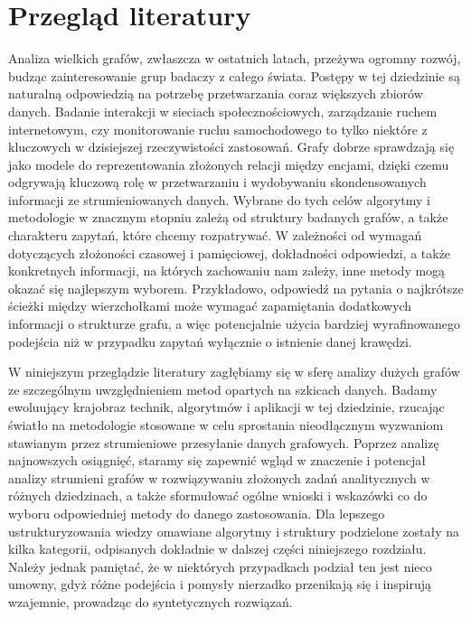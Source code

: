 \chapter{Przegląd literatury}

    Analiza wielkich grafów, zwłaszcza w ostatnich latach, przeżywa ogromny rozwój, budząc zainteresowanie grup badaczy z całego świata. Postępy w tej dziedzinie są naturalną odpowiedzią na potrzebę przetwarzania coraz większych zbiorów danych. Badanie interakcji w sieciach społecznościowych, zarządzanie ruchem internetowym, czy monitorowanie ruchu samochodowego to tylko niektóre z kluczowych w dzisiejszej rzeczywistości zastosowań. Grafy dobrze sprawdzają się jako modele do reprezentowania złożonych relacji między encjami, dzięki czemu odgrywają kluczową rolę w przetwarzaniu i wydobywaniu skondensowanych informacji ze strumieniowanych danych. Wybrane do tych celów algorytmy i metodologie w znacznym stopniu zależą od struktury badanych grafów, a także charakteru zapytań, które chcemy rozpatrywać. W zależności od wymagań dotyczących złożoności czasowej i pamięciowej, dokładności odpowiedzi, a także konkretnych informacji, na których zachowaniu nam zależy, inne metody mogą okazać się najlepszym wyborem. Przykładowo, odpowiedź na pytania o najkrótsze ścieżki między wierzchołkami może wymagać zapamiętania dodatkowych informacji o strukturze grafu, a więc potencjalnie użycia bardziej wyrafinowanego podejścia niż w przypadku zapytań wyłącznie o istnienie danej krawędzi. 

    W niniejszym przeglądzie literatury zagłębiamy się w sferę analizy dużych grafów ze szczególnym uwzględnieniem metod opartych na szkicach danych. Badamy ewoluujący krajobraz technik, algorytmów i aplikacji w tej dziedzinie, rzucając światło na metodologie stosowane w celu sprostania nieodłącznym wyzwaniom stawianym przez strumieniowe przesyłanie danych grafowych. Poprzez analizę najnowszych osiągnięć, staramy się zapewnić wgląd w znaczenie i potencjał analizy strumieni grafów w rozwiązywaniu złożonych zadań analitycznych w różnych dziedzinach, a także sformułować ogólne wnioski i wskazówki co do wyboru odpowiedniej metody do danego zastosowania. Dla lepszego ustrukturyzowania wiedzy omawiane algorytmy i struktury podzielone zostały na kilka kategorii, odpisanych dokładnie w dalszej części niniejszego rozdziału. Należy jednak pamiętać, że w niektórych przypadkach podział ten jest nieco umowny, gdyż różne podejścia i pomysły nierzadko przenikają się i inspirują wzajemnie, prowadząc do syntetycznych rozwiązań. 

